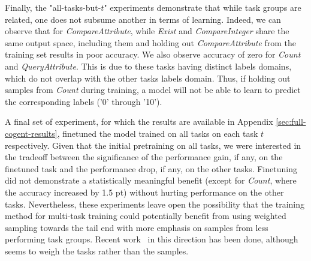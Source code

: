 Finally, the "all-tasks-but-$t$" experiments demonstrate that while task groups are related, one does not subsume another in terms of learning. Indeed, we can observe that for \textit{CompareAttribute}, while \textit{Exist} and \textit{CompareInteger} share the same output space, including them and holding out \textit{CompareAttribute} from the training set results in poor accuracy. We also observe accuracy of zero for \textit{Count} and \textit{QueryAttribute}. This is due to these tasks having distinct labels domains, which do not overlap with the other tasks labels domain. Thus, if holding out samples from \textit{Count} during training, a model will not be able to learn to predict the corresponding labels ('0' through '10').

 
A final set of experiment, for which the results are available in Appendix \ref{sec:full-cogent-results}, finetuned the model trained on all tasks on each task $t$ respectively. Given that the initial pretraining on all tasks, we were interested in the tradeoff between the significance of the performance gain, if any, on the finetuned task and the performance drop, if any, on the other tasks. Finetuning did not demonstrate a statistically meaningful benefit (except for \textit{Count}, where the accuracy increased by 1.5 pt) without hurting performance on the other tasks. Nevertheless, these experiments leave open the possibility that the training method for multi-task training could potentially benefit from using weighted sampling towards the tail end with more emphasis on samples from less performing task groups. Recent work~\cite{guo2018dynamic, kendall2018multi} in this direction has been done, although seems to weigh the tasks rather than the samples.